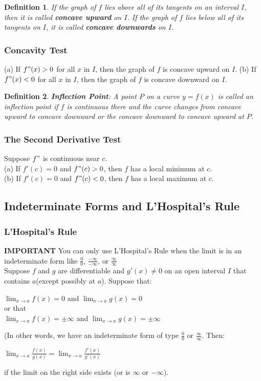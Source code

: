 \documentclass[10pt,a4paper]{article}
\newtheorem{definition}{Definition}
\begin{document}
\begin{definition}
	If the graph of $f$ lies above all of its tangents on an interval $I$, then it is called \textbf{concave upward} on $I$. If the graph of $f$ lies below all of its tangents on $I$, it is called \textbf{concave downwards} on $I$.
\end{definition}
\subsubsection{Concavity Test}
(a) If $f"(x) > 0$ for all $x$ in $I$, then the graph of $f$ is concave upward on $I$.
(b) If $f"(x) < 0$ for all $x$ in $I$, then the graph of $f$ is concave downward on $I$.

\begin{definition}
	\textbf{Inflection Point}: A point $P$ on a curve $y=f(x)$ is called an inflection point if $f$ is continuous there and the curve changes from concave upward to concave downward or the concave downward to concave upward at $P$.
\end{definition}
\subsubsection{The Second Derivative Test}
Suppose $f"$ is continuous near $c$. 
\\(a) If $f'(c) = 0$ and $f"(c) >0$, then $f$ has a local minimum at $c$.
\\(b) If $f'(c) = 0$ and $f"(c) < 0$, then $f$ has a local maximum at $c$.

\subsection{Indeterminate Forms and L'Hospital's Rule}
\subsubsection{L'Hospital's Rule}
\textbf{IMPORTANT} You can only use L'Hospital's Rule when the limit is in an indeterminate form like $\frac{0}{0}$, $\frac{-\infty}{-\infty}$, or $\frac{\infty}{\infty}$
\\Suppose $f$ and $g$ are differentiable and $g'(x) \neq 0 $ on an open interval $I$ that contains $a$(except possibly at $a$). Suppose that:
\begin{center}
	$\lim_{x\rightarrow a}{f(x)} = 0$ and
	$\lim_{x\rightarrow a}{g(x)} = 0$
\\	or that
\\	$\lim_{x\rightarrow a}{f(x)} = \pm \infty $ and $\lim_{x \rightarrow a}{g(x)} = \pm \infty $
\end{center}
(In other words, we have an indeterminate form of type $\frac{0}{0}$ or $\frac{\infty}{\infty}$. Then: 
\begin{center}
	$\lim_{x\rightarrow a}{\frac{f(x)}{g(x)}} = \lim_{x \rightarrow a}{\frac{f'(x)}{g'(x)}}$
\end{center}
if the limit on the right side exists (or is $\infty $ or $-\infty$).
\end{document}
